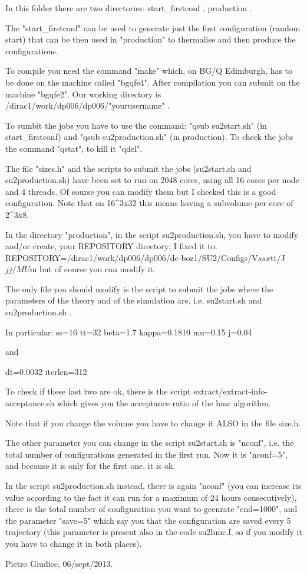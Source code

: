 In this folder there are two directories:
start_firstconf ,
production .

The "start_firstconf" can be used to generate just the first configuration
(random start) that can be then used in "production" to thermalise and 
then produce the configurations.

To compile you need the command "make" which, on BG/Q Edimburgh, has to be done
on the machine called "bgqfe4". After compilation you can submit on the 
machine "bgqfe2". Our working directory is  /dirac1/work/dp006/dp006/"yourusername" .

To sumbit the jobs you have to use the command: 
"qsub su2start.sh" (in start_firstconf) and
"qsub su2production.sh" (in production).
To check the jobs the command "qstat", to kill it "qdel".

The file "sizes.h" and the scripts to submit the jobs (su2start.sh and su2production.sh) 
have been set to run on 2048 cores, using all 16 cores per node and 4 threads. 
Of course you can modify them but I checked this is a good configuration. 
Note that on 16^3x32 this means having a subvolume per core of 2^3x8.

In the directory "production", in the script su2production.sh, you have to modify 
and/or create, your REPOSITORY directory;
I fixed it to:
REPOSITORY=/dirac1/work/dp006/dp006/dc-boz1/SU2/Configs/V${ss}x${tt}/J${jj}/MU$m
but of course you can modify it.

The only file you should modify is the script to submit the jobs where the parameters
of the theory and of the simulation are, i.e. su2start.sh and su2production.sh .

In particular:
ss=16
tt=32
beta=1.7
kappa=0.1810
mu=0.15
j=0.04

and

dt=0.0032
iterlen=312

To check if these last two are ok, there is the script 
extract/extract-info-acceptance.sh
which gives you the acceptance ratio of the hmc algorithm.

Note that if you change the volume you have to change it ALSO in the file size.h.

The other parameter you can change in the script su2start.sh is "nconf", 
i.e. the total number of configurations generated in the first run.
Now it is "nconf=5", and because it is only for the first one, it is ok.

In the script su2production.sh instead, there is again "nconf" 
(you can increase its value according to the fact it can run for a 
maximum of 24 hours consecutively), there is the total number of
configuration you want to geenrate "end=1000", and the parameter
"save=5" which say you that the configuration are saved every 5
trajectory (this parameter is present also in the code su2hmc.f, so if
you modify it you have to change it in both places).

Pietro Giudice,
06/sept/2013.


